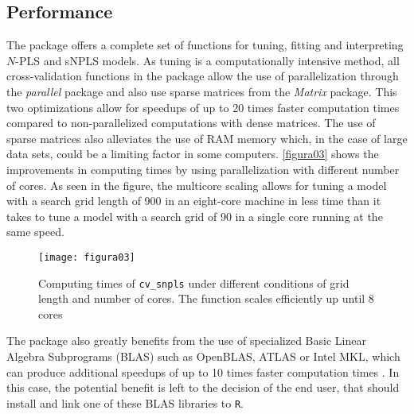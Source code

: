 \subsection{Performance}
The package offers a complete set of functions for tuning, fitting and interpreting $N$-PLS and sNPLS models. As tuning is a computationally intensive method, all cross-validation functions in the package allow the use of parallelization through the \textit{parallel} package and also use sparse matrices from the \textit{Matrix} package. This two optimizations allow for speedups of up to 20 times faster computation times compared to non-parallelized computations with dense matrices. The use of sparse matrices also alleviates the use of RAM memory which, in the case of large data sets, could be a limiting factor in some computers. \autoref{figura03} shows the improvements in computing times by using parallelization with different number of cores. As seen in the figure, the multicore scaling allows for tuning a model with a search grid length of 900 in an eight-core machine in less time than it takes to tune a model with a search grid of 90 in a single core running at the same speed.

\begin{figure}[hbtp]
	\centering
\texttt{[image: figura03]}
\caption[Computing times of \texttt{cv\_snpls} under different conditions of grid length and number of cores]{Computing times of \texttt{cv\_snpls} under different conditions of grid length and number of cores. The function scales efficiently up until 8 cores}
\label{figura03}
\end{figure}

The package also greatly benefits from the use of specialized Basic Linear Algebra Subprograms (BLAS) such as OpenBLAS, ATLAS or Intel\textsuperscript{\tiny\textregistered}  MKL, which can produce additional speedups of up to 10 times faster computation times \parencite{xianyi2014openblas, wang2014intel}. In this case, the potential benefit is left to the decision of the end user, that should install and link one of these BLAS libraries to \texttt{R}.

